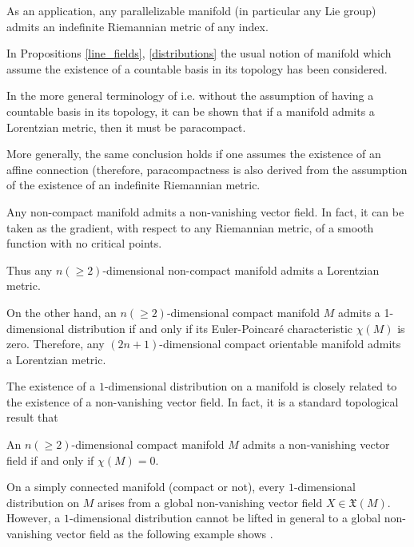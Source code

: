 
As an application, any parallelizable manifold (in particular any Lie group) admits an indefinite Riemannian metric of any index.

\begin{remark}
    In Propositions \ref{line_fields}, \ref{distributions} the usual notion of manifold which assume the existence of a countable basis in its topology has been considered.

    In the more general terminology of \cite{kobnom63} i.e. without the assumption of having a countable basis in its topology, it can be shown \cite{marathe72} that if a manifold admits a Lorentzian metric, then it must be paracompact.

    More generally, the same conclusion holds \cite[Cor. 25]{spivak79} if one assumes the existence of an affine connection (therefore, paracompactness is also derived from the assumption of the existence of an indefinite Riemannian metric.
\end{remark}


Any non-compact manifold admits a non-vanishing vector field. In fact, it can be taken as the gradient, with respect to any Riemannian metric, of a smooth function with no critical points.

Thus any $n(\geq 2)$-dimensional non-compact manifold admits a Lorentzian metric.

On the other hand, an $n(\geq 2)$-dimensional compact manifold $M$ admits a 1-dimensional distribution if and only if its Euler-Poincar\'{e} characteristic $\chi (M)$ is zero. Therefore, any $(2n+1)$-dimensional compact orientable manifold admits a Lorentzian metric.

\vspace{2mm}

The existence of a $1$-dimensional distribution on a manifold is closely related to the existence of a non-vanishing vector field. In fact, it is a standard topological result that

\begin{proposition}
    An $n(\geq 2)$-dimensional compact manifold $M$ admits a non-vanishing vector field if and only if $\chi(M)=0$.
\end{proposition}


On a simply connected manifold (compact or not), every $1$-dimensional distribution on $M$ arises from a global non-vanishing vector field $X\in \mathfrak{X}(M)$. However, a $1$-dimensional distribution cannot be lifted in general to a global non-vanishing vector field as the following example shows \cite{greub72}.

